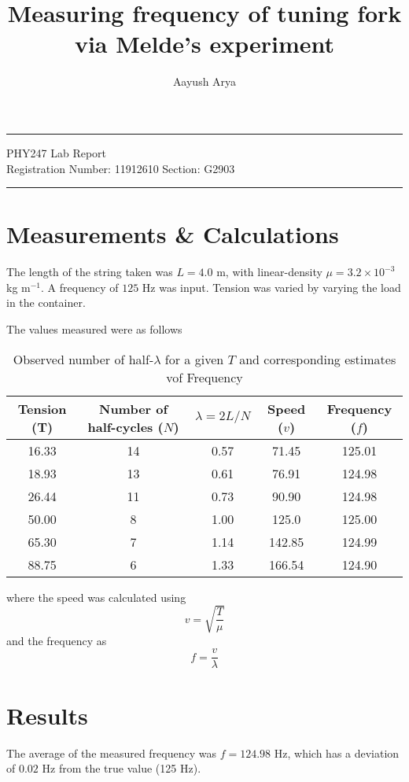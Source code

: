 \documentclass[11pt, a4paper]{article}
\begin{document}
	\author{Aayush Arya}
	\title{Measuring frequency of tuning fork via Melde's experiment}
	\maketitle
	
	\hrule
	\begin{center}
		PHY247 Lab Report\\
		Registration Number: 11912610 \quad Section: G2903
	\end{center}
	\hrule
	
	\section*{Measurements \& Calculations}
	
	The length of the string taken was $L = 4.0$ m, with linear-density $\mu = 3.2 \times 10^{-3}$ kg m$^{-1}$. A frequency of $125$ Hz was input. Tension was varied by varying the load in the container.
	
	The values measured were as follows
	
	\begin{table}[h]
		\centering
		\begin{tabular}{|c|c|c|c|c|}
			\hline
			Tension (T) & Number of half-cycles ($N$) & $\lambda = 2L/N$ & Speed ($v$) & Frequency ($f$)\\
			\hline
			16.33 & 14 & 0.57 & 71.45& 125.01\\
			18.93 & 13 &  0.61 & 76.91& 124.98\\
			26.44 & 11 & 0.73 & 90.90 & 124.98\\
			50.00 & 8 & 1.00 & 125.0  & 125.00\\
			65.30 &	7 & 1.14 & 142.85 & 124.99\\
			88.75 & 6 & 1.33 & 166.54 & 124.90\\
			\hline
		\end{tabular}
		\caption{Observed number of half-$\lambda$ for a given $T$ and corresponding estimates vof Frequency}
	\end{table}
	
	where the speed was calculated using $$ v = \sqrt{\frac{T}{\mu}}$$
	and the frequency as $$ f = \frac{v}{\lambda}$$
	
	\section*{Results}
	The average of the measured frequency was $f = 124.98$ Hz, which has a deviation of $0.02$ Hz from the true value (125 Hz).
	
\end{document}
